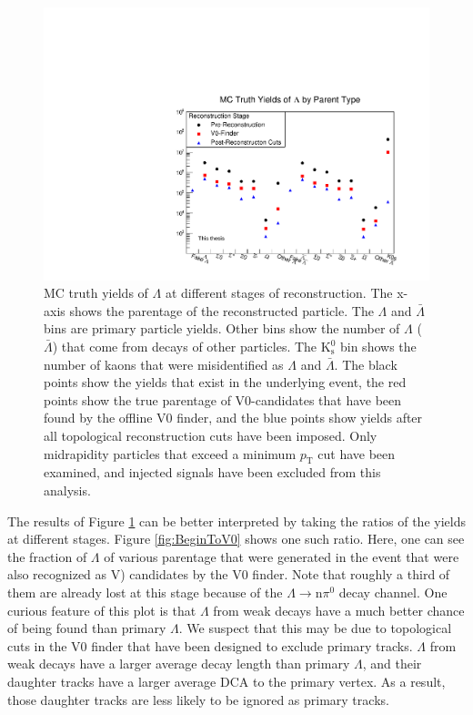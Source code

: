 \begin{figure}[hbt]
\includegraphics[width=36pc]{Figures/2014-02-03-MCYields.pdf}
\caption[$\Lambda$ MC Yields at Different Reconstruction Stages]{
MC truth yields of $\Lambda$ at different stages of reconstruction.
The x-axis shows the parentage of the reconstructed particle. 
The $\Lambda$ and $\bar{\Lambda}$ bins are primary particle yields.  
Other bins show the number of $\Lambda$ ($\bar{\Lambda}$) that come from decays of other particles. 
The $\mathrm{K^0_s}$ bin shows the number of kaons that were misidentified as $\Lambda$ and $\bar{\Lambda}$.
The black points show the yields that exist in the underlying event, the red points show the true parentage of V0-candidates that have been found by the offline V0 finder, and the blue points show yields after all topological reconstruction cuts have been imposed.
Only midrapidity particles that exceed a minimum $p_\mathrm{T}$ cut have been examined, and injected signals have been excluded from this analysis.}
\label{fig:MCYields}
\end{figure}

The results of Figure \ref{fig:MCYields} can be better interpreted by taking the ratios of the yields at different stages.  
Figure \ref{fig:BeginToV0} shows one such ratio.
Here, one can see the fraction of $\Lambda$ of various parentage that were generated in the event that were also recognized as V) candidates by the V0 finder.
Note that roughly a third of them are already lost at this stage because of the $\Lambda \rightarrow \mathrm{n}\pi^0$ decay channel.
One curious feature of this plot is that $\Lambda$ from weak decays have a much better chance of being found than primary $\Lambda$.
We suspect that this may be due to topological cuts in the V0 finder that have been designed to exclude primary tracks.
$\Lambda$ from weak decays have a larger average decay length than primary $\Lambda$, and their daughter tracks have a larger average DCA to the primary vertex.
As a result, those daughter tracks are less likely to be ignored as primary tracks.

